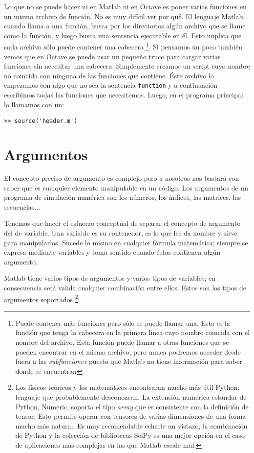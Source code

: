 Lo que no se puede hacer ni en Matlab ni en Octave es poner varias
funciones en un mismo archivo de función. No es muy difícil ver por
qué. El lenguaje Matlab, cuando llama a una función, busca por los
directorios algún archivo que se llame como la función, y luego busca
una sentencia ejecutable en él. Esto implica que cada archivo sólo
puede contener una cabecera%
\footnote{Puede contener más funciones pero sólo se puede llamar una.
  Esta es la función que tenga la cabecera en la primera linea cuyo
  nombre coincida con el nombre del archivo. Esta función puede llamar
  a otras funciones que se pueden encontrar en el mismo archivo, pero
  nunca podremos acceder desde fuera a las \emph{subfunciones} puesto
  que Matlab no tiene información para saber donde se encuentran%
}. Si pensamos un poco también vemos que en Octave se puede usar un
pequeño truco para cargar varias funciones sin necesitar una cabecera.
Simplemente creamos un script cuyo nombre no coincida con ninguna de
las funciones que contiene. Éste archivo lo empezamos con algo que no
sea la sentencia \texttt{function} y a continuación escribimos todas
las funciones que necesitemos. Luego, en el programa principal lo
llamamos con un:

\begin{verbatim}
>> source('header.m')
\end{verbatim}

\section{Argumentos}

El concepto preciso de argumento es complejo pero a nosotros nos
bastará con saber que es cualquier elemento manipulable en un código.
Los argumentos de un programa de simulación numérica son los números,
los índices, las matrices, las secuencias...

Tenemos que hacer el esfuerzo conceptual de separar el concepto de
argumento del de variable. Una variable es su contenedor, es lo que
les da nombre y sirve para manipularlos. Sucede lo mismo en cualquier
fórmula matemática; siempre se expresa mediante variables y toma
sentido cuando éstas contienen algún argumento.

Matlab tiene varios tipos de argumentos y varios tipos de variables;
en consecuencia será valida cualquier combinación entre ellos. Estos
son los tipos de argumentos soportados%
\footnote{Los físicos teóricos y los matemáticos encontraran mucho más
  útil Python; lenguaje que probablemente desconozcan. La extensión
  numérica estándar de Python, Numeric, soporta el tipo \emph{array}
  que es consistente con la definición de tensor. Esto permite operar
  con tensores de varias dimensiones de una forma mucho más natural.
  Es muy recomendable echarle un vistazo, la combinación de Python y
  la colección de bibliotecas SciPy es una mejor opción en el caso de
  aplicaciones más complejas en las que Matlab escale mal.%
}:


